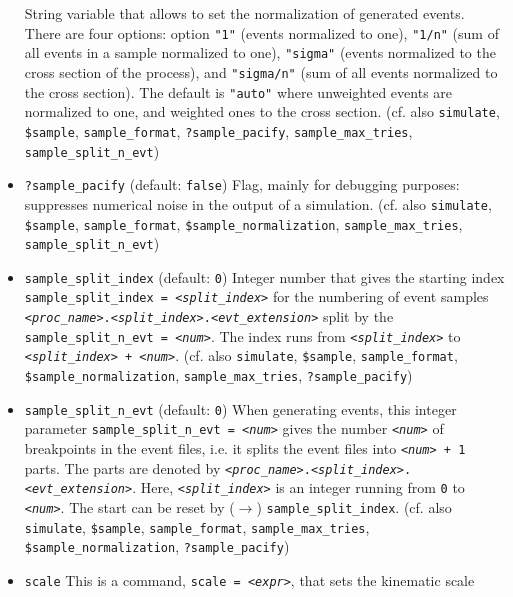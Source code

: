 \documentclass[12pt]{book}
\newcommand{\ttt}[1]{\texttt{#1}}
\begin{document}
\begin{itemize}
String variable that allows to set the normalization of generated
events. There are four options: option \ttt{"1"} (events normalized to
one), \ttt{"1/n"} (sum of all events in a sample normalized to one), 
\ttt{"sigma"} (events normalized to the cross section of the process),
and \ttt{"sigma/n"} (sum of all events normalized to the cross
section). The default is \ttt{"auto"} where unweighted events are
normalized to one, and weighted ones to the cross section. (cf. also
\ttt{simulate}, \ttt{\$sample}, \ttt{sample\_format},
\ttt{?sample\_pacify}, \ttt{sample\_max\_tries}, \ttt{sample\_split\_n\_evt}) 
\item
\ttt{?sample\_pacify} \qquad (default: \ttt{false}) \newline
Flag, mainly for debugging purposes: suppresses numerical noise in the
output of a simulation. (cf. also \ttt{simulate}, \ttt{\$sample},
\ttt{sample\_format}, \ttt{\$sample\_normalization},
\ttt{sample\_max\_tries}, \ttt{sample\_split\_n\_evt})
\item
\ttt{sample\_split\_index} \qquad (default: \ttt{0}) \newline
Integer number that gives the starting index \ttt{sample\_split\_index
= {\em <split\_index>}} for the numbering of event samples
\ttt{{\em <proc\_name>}.{\em <split\_index>}.{\em <evt\_extension>}} split by the 
\ttt{sample\_split\_n\_evt = {\em <num>}}. The index runs from
\ttt{{\em <split\_index>}} to \ttt{{\em <split\_index>} + {\em <num>}}. (cf. also
\ttt{simulate}, \ttt{\$sample}, \ttt{sample\_format},
\ttt{\$sample\_normalization}, \newline \ttt{sample\_max\_tries},
\ttt{?sample\_pacify}) 
\item
\ttt{sample\_split\_n\_evt} \qquad (default: \ttt{0}) \newline
When generating events, this integer parameter
\ttt{sample\_split\_n\_evt = {\em <num>}} gives the number \ttt{{\em <num>}} of
breakpoints in the event files, i.e. it splits the event files into
\ttt{{\em <num>} + 1} parts. The parts are denoted by
\ttt{{\em <proc\_name>}.{\em <split\_index>}.{\em <evt\_extension>}}. Here,
\ttt{{\em <split\_index>}} is an integer running from \ttt{0} to
\ttt{{\em <num>}}. The start can be reset by ($\to$)
\ttt{sample\_split\_index}. (cf. also \ttt{simulate}, \ttt{\$sample},
\ttt{sample\_format}, \ttt{sample\_max\_tries},
\ttt{\$sample\_normalization}, \ttt{?sample\_pacify})
\item
\ttt{scale} \newline
This is a command, \ttt{scale = {\em <expr>}}, that sets the kinematic scale

\end{itemize}
\end{document}
